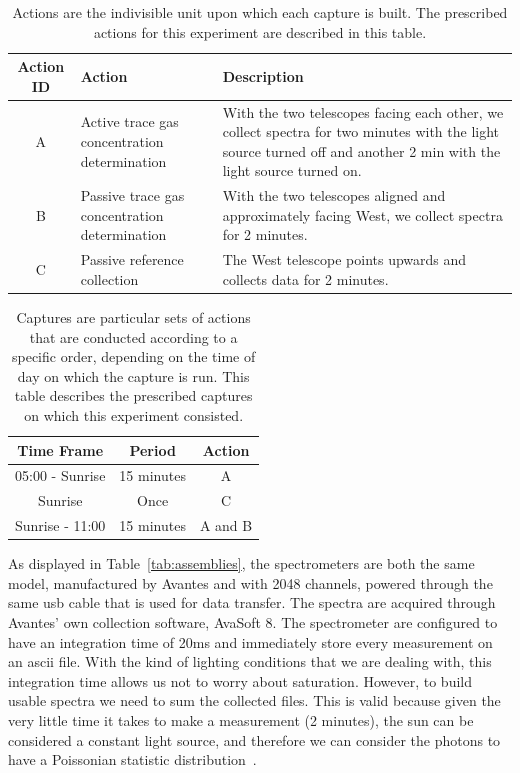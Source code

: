 \begin{table}[htpb]
    \centering
    \small
    \caption{Actions are the indivisible unit upon which each capture is
    built. The prescribed actions for this experiment are described in
    this table.}
    \label{tab:actions}
    \begin{tabularx}{\textwidth}{cXX}
        \toprule
        \textbf{Action ID} & \textbf{Action} & \textbf{Description} \\ \midrule
        A & Active trace gas concentration determination & With the two
        telescopes facing each other, we collect spectra for two minutes
        with the light source turned off and another 2 min with the light
        source turned on. \\
        \midrule
        B & Passive trace gas concentration determination & With the two
        telescopes aligned and approximately facing West, we collect spectra
        for 2 minutes. \\
        \midrule
        C & Passive reference collection & The West telescope points upwards
        and collects data for 2 minutes. \\ \bottomrule
    \end{tabularx}
\end{table}

\begin{table}[htpb]
    \centering
    \caption{Captures are particular sets of actions that are conducted
    according to a specific order, depending on the time of day on which
    the capture is run. This table describes the prescribed captures on
    which this experiment consisted.}
    \label{tab:captures}
    \begin{tabular}{@{}ccc@{}}
        \toprule
        \textbf{Time Frame} & \textbf{Period} & \textbf{Action} \\
        \midrule
        05:00 - Sunrise & 15 minutes & A \\
        Sunrise & Once & C \\
        Sunrise - 11:00 & 15 minutes & A and B\\
        \bottomrule
    \end{tabular}
\end{table}

As displayed in Table~\ref{tab:assemblies}, the spectrometers are both
the same model, manufactured by Avantes and with 2048 channels, powered
through the same \gls{usb} cable that is used for data transfer. The
spectra are acquired through Avantes' own collection software, AvaSoft
8. The spectrometer are configured to have an integration time of 20ms
and immediately store every measurement on an \gls{ascii} file. With the
kind of lighting conditions that we are dealing with, this integration
time allows us not to worry about saturation. However, to build usable
spectra we need to sum the collected files. This is valid because given
the very little time it takes to make a measurement (2 minutes), the sun
can be considered a constant light source, and therefore
we can consider the photons to have a Poissonian statistic
distribution~\cite{Fox2006}.

